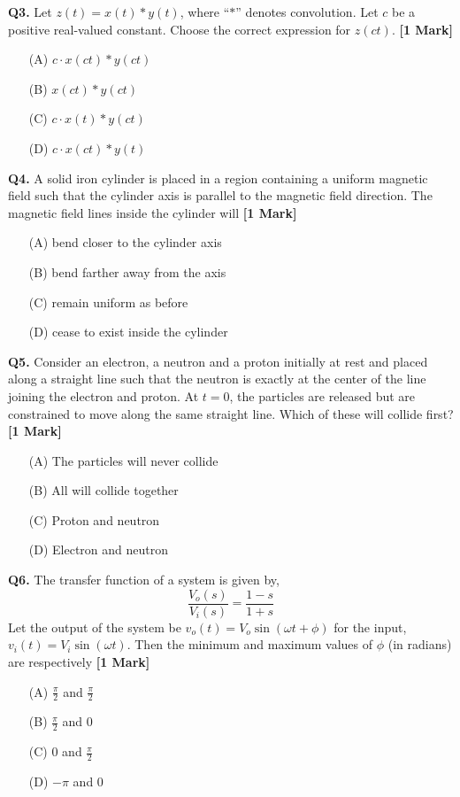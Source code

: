 \documentclass[11pt]{article}
\newcommand{\questiona}[2]{
    \noindent\textbf{Q#2.} #1 \hfill \textbf{[1 Mark]}
}
\begin{document}
\questiona{Let \( z(t) = x(t) * y(t) \), where “\(*\)” denotes convolution. Let \( c \) be a positive real-valued constant. Choose the correct expression for \( z(ct) \).}{3}
\begin{enumerate}
    \item[(A)] \( c \cdot x(ct) * y(ct) \)  
    \item[(B)] \( x(ct) * y(ct) \)  
    \item[(C)] \( c \cdot x(t) * y(ct) \)  
    \item[(D)] \( c \cdot x(ct) * y(t) \)  
\end{enumerate}
\vspace{0.5cm}

\questiona{A solid iron cylinder is placed in a region containing a uniform magnetic field such that the cylinder axis is parallel to the magnetic field direction. The magnetic field lines inside the cylinder will}{4}
\begin{enumerate}
    \item[(A)] bend closer to the cylinder axis  
    \item[(B)] bend farther away from the axis  
    \item[(C)] remain uniform as before  
    \item[(D)] cease to exist inside the cylinder  
\end{enumerate}
\vspace{0.5cm}

\questiona{Consider an electron, a neutron and a proton initially at rest and placed along a straight line such that the neutron is exactly at the center of the line joining the electron and proton. At \( t = 0 \), the particles are released but are constrained to move along the same straight line. Which of these will collide first?}{5}
\begin{enumerate}
    \item[(A)] The particles will never collide  
    \item[(B)] All will collide together  
    \item[(C)] Proton and neutron  
    \item[(D)] Electron and neutron  
\end{enumerate}
\vspace{0.5cm}

\questiona{The transfer function of a system is given by,\\
\[
\frac{V_o(s)}{V_i(s)} = \frac{1 - s}{1 + s}
\] 
Let the output of the system be \( v_o(t) = V_o \sin(\omega t + \phi) \) for the input, \( v_i(t) = V_i \sin(\omega t) \). Then the minimum and maximum values of \( \phi \) (in radians) are respectively}{6}
\begin{enumerate}
    \item[(A)] \( \frac{\pi}{2} \) and \( \frac{\pi}{2} \)  
    \item[(B)] \( \frac{\pi}{2} \) and 0  
    \item[(C)] 0 and \( \frac{\pi}{2} \)  
    \item[(D)] \(-\pi \) and 0  
\end{enumerate}
\vspace{0.5cm}
\end{document}
